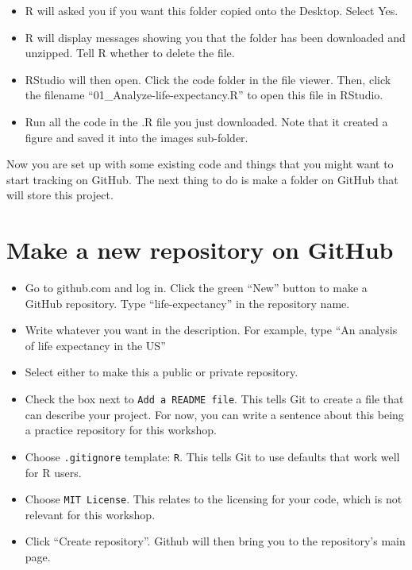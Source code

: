 \documentclass[
]{book}
\providecommand{\tightlist}{%
  \setlength{\itemsep}{0pt}\setlength{\parskip}{0pt}}
\begin{document}
\begin{itemize}
\tightlist
\item
  R will asked you if you want this folder copied onto the Desktop. Select Yes.
\item
  R will display messages showing you that the folder has been downloaded and unzipped.
  Tell R whether to delete the file.
\item
  RStudio will then open. Click the code folder in the file viewer. Then, click
  the filename ``01\_Analyze-life-expectancy.R'' to open this file in RStudio.
\item
  Run all the code in the .R file you just downloaded. Note that it created a figure and
  saved it into the images sub-folder.
\end{itemize}

Now you are set up with some existing code and things that you might want to start
tracking on GitHub. The next thing to do is make a folder on GitHub that will
store this project.

\hypertarget{make-a-new-repository-on-github}{%
\section{Make a new repository on GitHub}\label{make-a-new-repository-on-github}}

\begin{itemize}
\tightlist
\item
  Go to github.com and log in. Click the green ``New'' button to make a GitHub
  repository. Type ``life-expectancy'' in the repository name.
\item
  Write whatever you want in the description. For example, type ``An analysis of life expectancy in the US''
\item
  Select either to make this a public or private repository.
\item
  Check the box next to \texttt{Add\ a\ README\ file}. This tells Git to create a file that can describe your project. For now, you can write a sentence about this being a practice repository for this workshop.\\
\item
  Choose \texttt{.gitignore} template: \texttt{R}. This tells Git to use defaults that work well for R users.\\
\item
  Choose \texttt{MIT\ License}. This relates to the licensing for your code, which is not relevant for this workshop.\\
\item
  Click ``Create repository''. Github will then bring you to the repository's
  main page.
\end{itemize}
\end{document}

